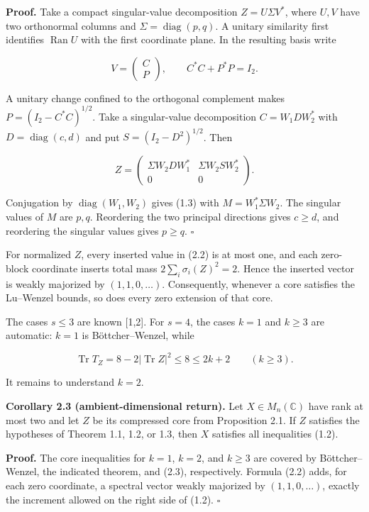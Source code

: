 \documentclass[11pt]{article}
\begin{document}
\textbf{Proof.} Take a compact singular-value decomposition $Z=U\Sigma V^*$, where $U,V$ have two orthonormal columns and $\Sigma=\operatorname{diag}(p,q)$. A unitary similarity first identifies $\operatorname{Ran}U$ with the first coordinate plane. In the resulting basis write

\[
V=\begin{pmatrix}C\\P\end{pmatrix},\qquad C^*C+P^*P=I_2.
\]

A unitary change confined to the orthogonal complement makes $P=(I_2-C^*C)^{1/2}$. Take a singular-value decomposition $C=W_1DW_2^*$ with $D=\operatorname{diag}(c,d)$ and put $S=(I_2-D^2)^{1/2}$. Then

\[
Z=\begin{pmatrix}
\Sigma W_2DW_1^*&\Sigma W_2SW_2^*\\0&0
\end{pmatrix}.
\]

Conjugation by $\operatorname{diag}(W_1,W_2)$ gives (1.3) with $M=W_1^*\Sigma W_2$. The singular values of $M$ are $p,q$. Reordering the two principal directions gives $c\ge d$, and reordering the singular values gives $p\ge q$. $\square$

For normalized $Z$, every inserted value in (2.2) is at most one, and each zero-block coordinate inserts total mass $2\sum_i\sigma_i(Z)^2=2$. Hence the inserted vector is weakly majorized by $(1,1,0,\ldots)$. Consequently, whenever a core satisfies the Lu--Wenzel bounds, so does every zero extension of that core.

The cases $s\le3$ are known [1,2]. For $s=4$, the cases $k=1$ and $k\ge3$ are automatic: $k=1$ is Böttcher--Wenzel, while

\begin{equation}
\operatorname{Tr}T_Z=8-2|\operatorname{Tr}Z|^2\le8\le2k+2
\qquad(k\ge3).
\tag{2.3}
\end{equation}

It remains to understand $k=2$.

\textbf{Corollary 2.3 (ambient-dimensional return).} Let $X\in M_n(\mathbb C)$ have rank at most two and let $Z$ be its compressed core from Proposition 2.1. If $Z$ satisfies the hypotheses of Theorem 1.1, 1.2, or 1.3, then $X$ satisfies all inequalities (1.2).

\textbf{Proof.} The core inequalities for $k=1$, $k=2$, and $k\ge3$ are covered by Böttcher--Wenzel, the indicated theorem, and (2.3), respectively. Formula (2.2) adds, for each zero coordinate, a spectral vector weakly majorized by $(1,1,0,\ldots)$, exactly the increment allowed on the right side of (1.2). $\square$
\end{document}
